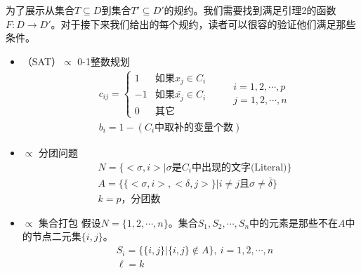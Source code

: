 \documentclass[twocolumn]{article}
\theoremstyle{nonumberplain}%
\begin{document}
\begin{CJK}{UTF8}{gbsn}
    为了展示从集合$T\subseteq D$到集合$T'\subseteq D'$的规约。我们需要找到满足引理2的函数$F:D\rightarrow D'$。对于接下来我们给出的每个规约，读者可以很容的验证他们满足那些条件。
    \begin{itemize}
    \item {（SAT）$\propto$ 0-1整数规划}
        \begin{equation}\nonumber %
        \begin{aligned}
            &c_{ij}=\left\{
            \begin{matrix}
              1 & \text{如果}x_j\in C_i \\
              -1 & \text{如果}\bar{x_j}\in C_i \\
              0 & \text{其它}
            \end{matrix}
            \right.
            \qquad
            \begin{matrix}
              i=1,2,\cdots,p\\
              j=1,2,\cdots,n
            \end{matrix}
            \\
            &b_i=1-(C_i\text{中取补的变量个数})
        \end{aligned}
        \end{equation}

    \item { $\propto$ 分团问题}
        \begin{equation}\nonumber %
        \begin{aligned}
        & N = \{<\sigma,i>|\sigma\text{是}C_i\text{中出现的文字(Literal)}\} \\
        & A = \{\{<\sigma,i>,<\delta,j>\}|i\neq j\text{且}\sigma\neq\bar{\delta}\} \\
        & k = p\text{，分团数}
        \end{aligned}
        \end{equation}

    \item { $\propto$ 集合打包}
        假设$N=\{1,2,\cdots,n\}$。集合$S_1,S_2,\cdots,S_n$中的元素是那些不在$A$中的节点二元集$\{i,j\}$。
        \begin{equation}\nonumber %
        \begin{aligned}
        & S_i=\{\{i,j\}|\{i,j\}\notin A\},\ i=1,2,\cdots,n\\
        & \ell=k
        \end{aligned}
        \end{equation}


\end{itemize}
\end{CJK}
\end{document}
